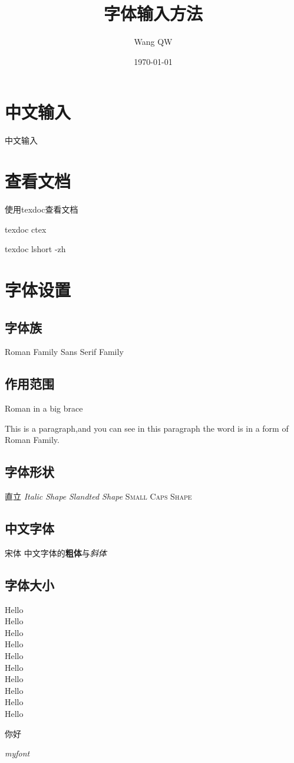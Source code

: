 \documentclass{article}
\title{\heiti 字体输入方法}%
\author{Wang QW}
\date{\today}
\newcommand{\myFont}{\textit{\Huge{myfont}}}
\begin{document}
	\maketitle
\section{中文输入}
	中文输入
\section{查看文档}	
	使用texdoc查看文档
	
	texdoc ctex
	
	texdoc lshort -zh
	
\section{字体设置}
\subsection{字体族}
\textrm{Roman Family} \textsf{Sans Serif Family}
\subsection{作用范围}
{\rmfamily Roman in a big brace}

\rmfamily This is a paragraph,and you can see in this paragraph the word is in a form of Roman Family.

\subsection{字体形状}
\textup{直立} \textit{Italic Shape} \textsl{Slandted Shape} \textsc{Small Caps Shape}
\subsection{中文字体}
{\songti 宋体}  
中文字体的\textbf{粗体}与\textit{斜体}
\subsection{字体大小}
{\tiny Hello}\\
{\scriptsize Hello}\\
{\footnotesize Hello}\\
{\small Hello}\\
{\normalsize Hello}\\
{\large Hello}\\
{\Large Hello}\\
{\LARGE Hello}\\
{\huge Hello}\\
{\Huge Hello}

 你好

\myFont
\end{document}
